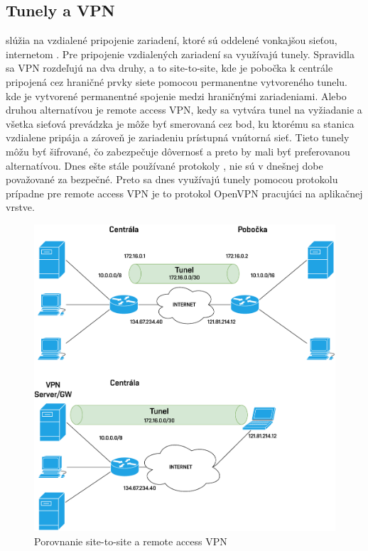 \subsection*{Tunely a VPN}
 slúžia na vzdialené pripojenie zariadení, ktoré sú oddelené vonkajšou sieťou, internetom \cite{Lammle2013}. Pre pripojenie vzdialených zariadení sa využívajú tunely. Spravidla sa VPN rozdeľujú na dva druhy, a to site-to-site, kde je pobočka k centrále pripojená cez hraničné prvky siete pomocou permanentne vytvoreného tunelu.  kde je vytvorené permanentné spojenie medzi hraničnými zariadeniami. Alebo druhou alternatívou je remote access VPN, kedy sa vytvára tunel na vyžiadanie a všetka sieťová prevádzka je môže byť smerovaná cez bod, ku ktorému sa stanica vzdialene pripája a zároveň je zariadeniu prístupná vnútorná sieť. Tieto tunely môžu byť šifrované, čo zabezpečuje dôvernosť a preto by mali byť preferovanou alternatívou. Dnes ešte stále používané protokoly ,  nie sú v dnešnej dobe považované za bezpečné. Preto sa dnes využívajú tunely pomocou protokolu  prípadne pre remote access VPN je to protokol OpenVPN pracujúci na aplikačnej vrstve.

\begin{figure}[H]
	\begin{center}
		\includegraphics[scale=0.6]{obrazky/tunnels.pdf}
	\end{center}
	\caption[Porovnanie site-to-site a remote access VPN]{Porovnanie site-to-site a remote access VPN}
	\label{fig:tunnel}
\end{figure} 


